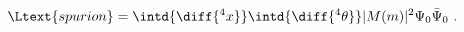 \begin{equation}
  \label{eq:spurion}
  \Ltext{spurion} = \intd{\diff{^4x}} \intd{\diff{^4 \theta}} |M(m)|^2 \Psi_0
  \bar{\Psi}_0\ .
\end{equation}

